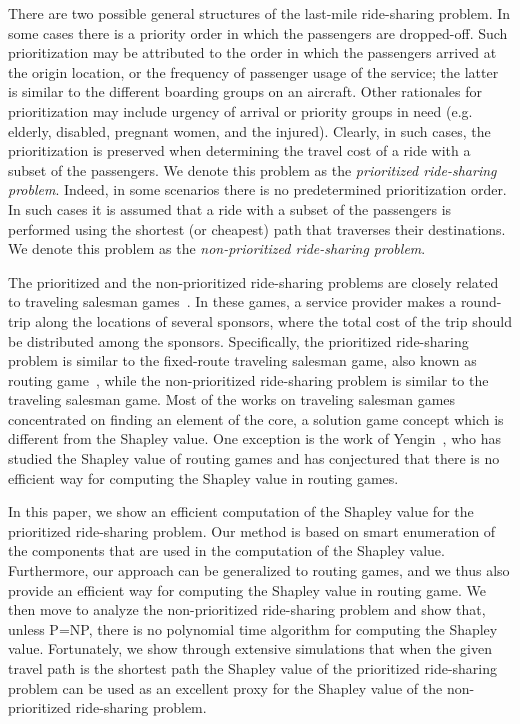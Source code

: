\documentclass[sigconf]{aamas}
\begin{document}
There are two possible general structures of the last-mile ride-sharing problem. In some cases there is a priority order in which the passengers are dropped-off.
Such prioritization may be attributed to the order in which the passengers arrived at the origin location, or the frequency of passenger usage of the service; the latter is similar to the different boarding groups on an aircraft. Other rationales for prioritization may include urgency of arrival or priority groups in need (e.g. elderly, disabled, pregnant women, and the injured). Clearly, in such cases, the prioritization is preserved when determining the travel cost of a ride with a subset of the passengers.
We denote this problem as the \emph{prioritized ride-sharing problem}.
Indeed, in some scenarios there is no predetermined prioritization order. In such cases it is assumed that a ride with a subset of the passengers is performed using the shortest (or cheapest) path that traverses their destinations. We denote this problem as the \emph{non-prioritized ride-sharing problem}.

The prioritized and the non-prioritized ride-sharing problems are closely related to traveling salesman games~\cite{potters1992traveling}. In these games, a service provider makes a round-trip along the locations of several sponsors, where the total cost of the trip should be distributed among the sponsors. 
Specifically, the prioritized ride-sharing problem is similar to the fixed-route traveling salesman game, also known as routing game~\cite{yengin2012characterizing}, while the non-prioritized ride-sharing problem is similar to the traveling salesman game.  
Most of the works on traveling salesman games concentrated on finding an element of the core, a solution game concept which is different from the Shapley value. One exception is the work of Yengin~\cite{yengin2012characterizing}, who has studied the Shapley value of routing games and has conjectured that there is no efficient way for computing the Shapley value in routing games. 

In this paper, we show an efficient computation of the Shapley value for the prioritized ride-sharing problem. Our method is based on smart enumeration of the components that are used in the computation of the Shapley value. Furthermore, our approach can be generalized to routing games, and we thus also provide an efficient way for computing the Shapley value in routing game. We then move to analyze the non-prioritized ride-sharing problem and show that, unless P=NP, there is no polynomial time algorithm for computing the Shapley value. Fortunately, we show through extensive simulations that when the given travel path is the shortest path the Shapley value of the prioritized ride-sharing problem can be used as an excellent proxy for the Shapley value of the non-prioritized ride-sharing problem.
\end{document}
